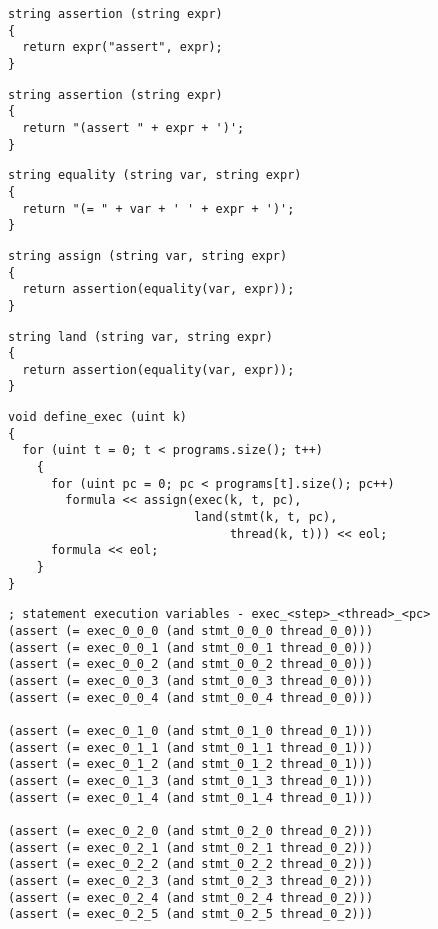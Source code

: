 \begin{lstlisting}[style=c++]
string assertion (string expr)
{
  return expr("assert", expr);
}
\end{lstlisting}

\begin{lstlisting}[style=c++]
string assertion (string expr)
{
  return "(assert " + expr + ')';
}
\end{lstlisting}

\begin{lstlisting}[style=c++]
string equality (string var, string expr)
{
  return "(= " + var + ' ' + expr + ')';
}
\end{lstlisting}

\begin{lstlisting}[style=c++]
string assign (string var, string expr)
{
  return assertion(equality(var, expr));
}
\end{lstlisting}

\begin{lstlisting}[style=c++]
string land (string var, string expr)
{
  return assertion(equality(var, expr));
}
\end{lstlisting}

\begin{lstlisting}[style=c++]
void define_exec (uint k)
{
  for (uint t = 0; t < programs.size(); t++)
    {
      for (uint pc = 0; pc < programs[t].size(); pc++)
        formula << assign(exec(k, t, pc),
                          land(stmt(k, t, pc),
                               thread(k, t))) << eol;
      formula << eol;
    }
}
\end{lstlisting}

\begin{lstlisting}[language=SMTLib]
; statement execution variables - exec_<step>_<thread>_<pc>
(assert (= exec_0_0_0 (and stmt_0_0_0 thread_0_0)))
(assert (= exec_0_0_1 (and stmt_0_0_1 thread_0_0)))
(assert (= exec_0_0_2 (and stmt_0_0_2 thread_0_0)))
(assert (= exec_0_0_3 (and stmt_0_0_3 thread_0_0)))
(assert (= exec_0_0_4 (and stmt_0_0_4 thread_0_0)))

(assert (= exec_0_1_0 (and stmt_0_1_0 thread_0_1)))
(assert (= exec_0_1_1 (and stmt_0_1_1 thread_0_1)))
(assert (= exec_0_1_2 (and stmt_0_1_2 thread_0_1)))
(assert (= exec_0_1_3 (and stmt_0_1_3 thread_0_1)))
(assert (= exec_0_1_4 (and stmt_0_1_4 thread_0_1)))

(assert (= exec_0_2_0 (and stmt_0_2_0 thread_0_2)))
(assert (= exec_0_2_1 (and stmt_0_2_1 thread_0_2)))
(assert (= exec_0_2_2 (and stmt_0_2_2 thread_0_2)))
(assert (= exec_0_2_3 (and stmt_0_2_3 thread_0_2)))
(assert (= exec_0_2_4 (and stmt_0_2_4 thread_0_2)))
(assert (= exec_0_2_5 (and stmt_0_2_5 thread_0_2)))
\end{lstlisting}

